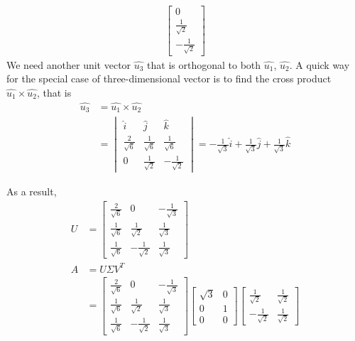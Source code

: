 \begin{exmp}
\begin{align*}
\begin{bmatrix}
0 \\
\frac{1}{\sqrt{2}} \\
-\frac{1}{\sqrt{2}} 
\end{bmatrix}
\end{align*}
We need another unit vector $\hat{u_3}$ that is orthogonal to both $\hat{u_1}$, $\hat{u_2}$. A quick way for the special case of three-dimensional vector is to find the cross product $\hat{u_1} \times \hat{u_2}$, that is
\begin{align*}
\hat{u_3} &= \hat{u_1} \times \hat{u_2} \\
&=
\begin{vmatrix}
\hat{i} & \hat{j} & \hat{k} \\
\frac{2}{\sqrt{6}} & \frac{1}{\sqrt{6}} & \frac{1}{\sqrt{6}}  \\
0 & \frac{1}{\sqrt{2}} & -\frac{1}{\sqrt{2}}
\end{vmatrix}
= -\frac{1}{\sqrt{3}} \hat{i} + \frac{1}{\sqrt{3}} \hat{j} + \frac{1}{\sqrt{3}} \hat{k}
\end{align*}
\end{exmp}
As a result,
\begin{align*}
U &=
\begin{bmatrix}
\frac{2}{\sqrt{6}} & 0 & -\frac{1}{\sqrt{3}} \\
\frac{1}{\sqrt{6}} & \frac{1}{\sqrt{2}} & \frac{1}{\sqrt{3}}\\
\frac{1}{\sqrt{6}} & -\frac{1}{\sqrt{2}} & \frac{1}{\sqrt{3}}
\end{bmatrix} \\
A &= U\Sigma V^T \\
&= 
\begin{bmatrix}
\frac{2}{\sqrt{6}} & 0 & -\frac{1}{\sqrt{3}} \\
\frac{1}{\sqrt{6}} & \frac{1}{\sqrt{2}} & \frac{1}{\sqrt{3}}\\
\frac{1}{\sqrt{6}} & -\frac{1}{\sqrt{2}} & \frac{1}{\sqrt{3}}
\end{bmatrix}
\begin{bmatrix}
\sqrt{3} & 0 \\
0 & 1 \\
0 & 0
\end{bmatrix} 
\begin{bmatrix}
\frac{1}{\sqrt{2}} & \frac{1}{\sqrt{2}}\\
-\frac{1}{\sqrt{2}} & \frac{1}{\sqrt{2}}
\end{bmatrix}
\end{align*}

